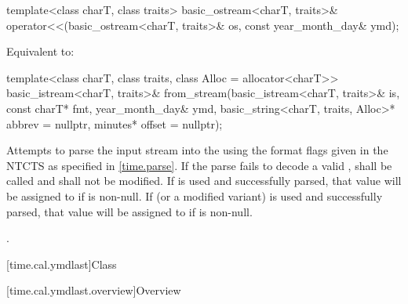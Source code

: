 %
\begin{itemdecl}
template<class charT, class traits>
  basic_ostream<charT, traits>&
    operator<<(basic_ostream<charT, traits>& os, const year_month_day& ymd);
\end{itemdecl}

\begin{itemdescr}
\pnum
\effects
Equivalent to:
\end{itemdescr}

%
\begin{itemdecl}
template<class charT, class traits, class Alloc = allocator<charT>>
  basic_istream<charT, traits>&
    from_stream(basic_istream<charT, traits>& is, const charT* fmt,
                year_month_day& ymd, basic_string<charT, traits, Alloc>* abbrev = nullptr,
                minutes* offset = nullptr);
\end{itemdecl}

\begin{itemdescr}
\pnum
\effects
Attempts to parse the input stream 
into the   using
the format flags given in the NTCTS 
as specified in \ref{time.parse}.
If the parse fails to decode a valid ,
 shall be called
and  shall not be modified.
If  is used and successfully parsed,
that value will be assigned to  if  is non-null.
If  (or a modified variant) is used and successfully parsed,
that value will be assigned to  if  is non-null.

\pnum
\returns
{}.
\end{itemdescr}

[time.cal.ymdlast]{Class }

[time.cal.ymdlast.overview]{Overview}

